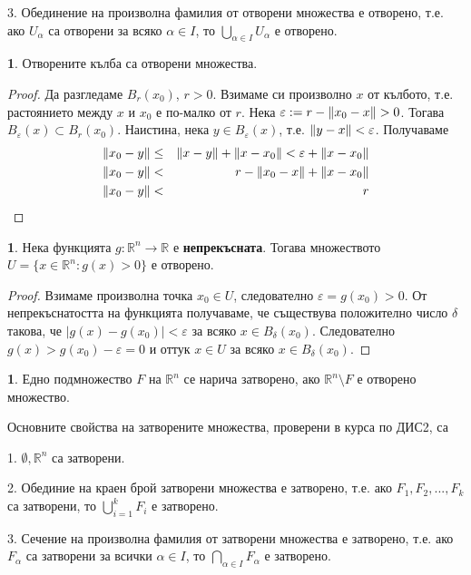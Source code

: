 \documentclass[11pt]{article}
\numberwithin{equation}{section}
\numberwithin{figure}{section}
\numberwithin{table}{section}
\theoremstyle{plain}
\theoremstyle{definition}
\newtheorem{defn}[thm]{\protect\definitionname}
\theoremstyle{remark}
\theoremstyle{definition}
\theoremstyle{remark}
\theoremstyle{plain}
\theoremstyle{definition}
\theoremstyle{definition}
\newtheorem{example}[thm]{\protect\examplename}
\theoremstyle{plain}
\theoremstyle{plain}
\theoremstyle{plain}
\theoremstyle{definition}
\theoremstyle{plain}
\providecommand{\definitionname}{Дефиниция}
\providecommand{\examplename}{Пример}
\DeclarePairedDelimiter\norm{\lVert}{\rVert}
\newcommand*{\R}{\mathbb{R}}
\begin{document}
3. Обединение на произволна фамилия от отворени множества е отворено, т.е. ако $U_\alpha$ са отворени за всяко $\alpha \in I$, то $\bigcup _{\alpha \in I} U_\alpha$ е отворено.

\begin{example}
Отворените кълба са отворени множества.
\begin{proof}
Да разгледаме $B_r(x_0)$, $r>0$. Взимаме си произволно $x$ от кълбото, т.е. растоянието между $x$ и $x_0$ е по-малко от $r$. Нека $\varepsilon := r - \norm{x_0-x}>0$. Тогава $B_\varepsilon(x)\subset B_r(x_0)$. Наистина, нека $y\in B_\varepsilon(x)$, т.е. $\norm{y-x} <\varepsilon$. Получаваме
\begin{eqnarray*}
\norm{x_0-y} &\leq& \norm{x-y} + \norm{x-x_0} < \varepsilon + \norm{x-x_0}\\
\norm{x_0-y} &<& r - \norm{x_0-x} + \norm{x-x_0}\\
\norm{x_0-y} &<& r
\end{eqnarray*}
\end{proof}
\end{example}

\begin{example}
Нека функцията  $g:\R^n \rightarrow \R$ е \textbf{непрекъсната}. Тогава множеството \\ $U = \{x\in\R^n:g(x)>0\}$ е отворено.
\begin{proof}
Взимаме произволна точка $x_0\in U$, следователно $\varepsilon = g(x_0)>0$. От непрекъснатостта на функцията получаваме, че съществува положително число $\delta$ такова, че $|g(x)-g(x_0)|<\varepsilon$ за всяко $x\in B_\delta(x_0)$. Следователно $g(x)>g(x_0)-\varepsilon = 0$ и оттук $x \in U$ за всяко $x\in B_\delta(x_0)$.
\end{proof}
\end{example}

\begin{defn} Едно подмножество
$F$ на $\R^n $ се нарича затворено, ако $\R^n \setminus F$ е отворено множество.
\end{defn}

Основните свойства на затворените множества, проверени в курса по ДИС2, са

1. $\emptyset, \R^n$ са затворени.

2. Обединие на краен брой затворени множества е затворено, т.е. ако $F_1, F_2, ..., F_k$ са затворени, то $\bigcup_{i=1}^k F_i$ е затворено.

3. Сечение на произволна фамилия от затворени множества е затворено, т.е. ако $F_\alpha$ са затворени за всички $\alpha \in I$, то $\bigcap _{\alpha \in I} F_\alpha$ е затворено.
\end{document}
